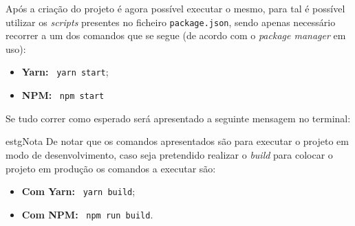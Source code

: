 
Após a criação do projeto é agora possível executar o mesmo, para tal é possível utilizar os \textit{scripts} presentes no ficheiro \texttt{package.json}, sendo apenas necessário recorrer a um dos comandos que se segue (de acordo com o \textit{package manager} em uso):

\begin{itemize}
	\item \textbf{Yarn:} ~\texttt{yarn start};
	\item \textbf{NPM:} ~\texttt{npm start}
\end{itemize}

Se tudo correr como esperado será apresentado a seguinte mensagem no terminal:


\begin{mybox}{estg}{Nota}
	De notar que os comandos apresentados são para executar o projeto em modo de desenvolvimento, caso seja pretendido realizar o \textit{build} para colocar o projeto em produção os comandos a executar são:

	\begin{itemize}
		\item \textbf{Com Yarn:} ~\texttt{yarn build};
		\item \textbf{Com NPM:} ~\texttt{npm run build}.
	\end{itemize}
\end{mybox}